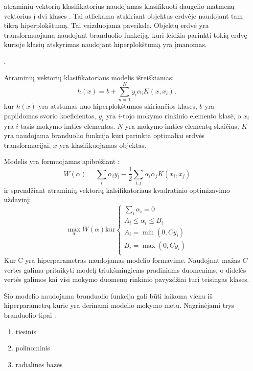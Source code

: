 atraminių vektorių klasifikatorius naudojamas klasifikuoti daugelio matmenų vektorius į dvi klases \cite{comp}. Tai atliekama atskiriant objektus erdvėje naudojant tam tikrą hiperplokštumą. Tai vaizduojama  paveiksle. Objektų erdvė yra transformuojama naudojant branduolio funkciją, kuri leidžia parinkti tokią erdvę kurioje klasių atskyrimas naudojant hiperplokštumą yra įmanomas.

.

Atraminių vektorių klasifikatoriaus modelis išreiškiamas\cite{comp}:
\begin{equation}
    h(x) = b + \sum_{n=1}^{N}y_i \alpha_i K(x, x_i),
\end{equation}
kur $h(x)$ yra atstumas nuo hiperplokštumos skiriančios klases, $b$ yra papildomas svorio koeficientas, $y_i$ yra $i$-tojo mokymo rinkinio elemento klasė, o $x_i$ yra $i$-tasis mokymo imties elementas. $N$ yra mokymo imties elementų skaičius, $K$ yra naudojama branduolio funkcija kuri parinkta optimaliai erdvės transformacijai, $x$ yra klasifikuojamas objektas.

Modelis yra formuojamas apibrėžiant \cite{ksvm}:
\begin{equation}
    W(\alpha) = \sum_{i}\alpha_i y_i - \frac{1}{2} \sum_{i, j} \alpha_i \alpha_j K(x_i, x_j)
\end{equation}
ir sprendžiant atraminių vektorių kalsifikatoriaus kvadratinio optimizavimo uždavinį:
\begin{equation}
\max_{\alpha} W(\alpha) \text{kur} \left\{
                  \begin{array}{l}
                    \sum_{i} \alpha_i = 0 \\
                    A_i \leq \alpha_i \leq B_i \\
                    A_i = \min(0, Cy_i) \\
                    B_i = \max(0, Cy_i) \\
                  \end{array}
                \right.
\end{equation}
Kur C yra hiperparametras naudojamas modelio formavime. Naudojant mažas $C$ vertes galima pritaikyti modelį triukšmingiems pradiniams duomenims, o didelės vertės galimos kai visi mokymo duomenų rinkinio pavyzdžiai turi teisingas klases.

Šio modelio naudojama branduolio funkcija gali būti laikoma vienu iš hiperparametrų kurie yra derinami modelio mokymo metu. Nagrinėjami trys branduolio tipai \cite{vw}:
\begin{enumerate}
    \item tiesinis
    \item polinominis
    \item radialinės bazės
\end{enumerate}

